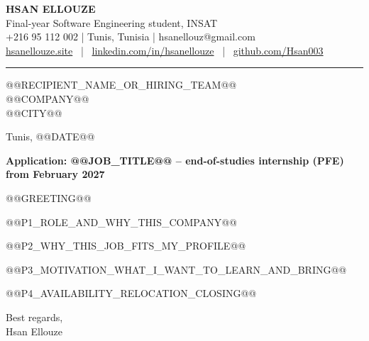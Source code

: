 \documentclass[10pt,a4paper]{article}
\begin{document}
{\LARGE\bfseries HSAN ELLOUZE}\\[3pt]
{\color{muted} Final-year Software Engineering student, INSAT}\\[2pt]
{\footnotesize +216 95 112 002 | Tunis, Tunisia | hsanellouz@gmail.com}\\[1pt]
{\footnotesize \href{https://hsanellouze.site}{hsanellouze.site} \ | \ \href{https://linkedin.com/in/hsanellouze}{linkedin.com/in/hsanellouze} \ | \ \href{https://github.com/Hsan003}{github.com/Hsan003}}

{\color{muted}\rule{\linewidth}{0.4pt}}

@@RECIPIENT_NAME_OR_HIRING_TEAM@@\\
@@COMPANY@@\\
@@CITY@@

{\raggedleft Tunis, @@DATE@@\par}

\textbf{Application: @@JOB_TITLE@@ -- end-of-studies internship (PFE) from February 2027}

@@GREETING@@

@@P1_ROLE_AND_WHY_THIS_COMPANY@@

@@P2_WHY_THIS_JOB_FITS_MY_PROFILE@@

@@P3_MOTIVATION_WHAT_I_WANT_TO_LEARN_AND_BRING@@

@@P4_AVAILABILITY_RELOCATION_CLOSING@@

Best regards,\\[4pt]
Hsan Ellouze
\end{document}
